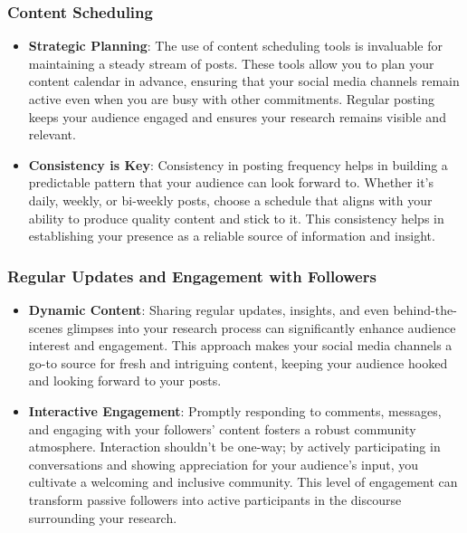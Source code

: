 \documentclass[
]{book}
\begin{document}
\hypertarget{content-scheduling}{%
\subsubsection{Content Scheduling}\label{content-scheduling}}

\begin{itemize}
\item
  \textbf{Strategic Planning}: The use of content scheduling tools is invaluable for maintaining a steady stream of posts. These tools allow you to plan your content calendar in advance, ensuring that your social media channels remain active even when you are busy with other commitments. Regular posting keeps your audience engaged and ensures your research remains visible and relevant.
\item
  \textbf{Consistency is Key}: Consistency in posting frequency helps in building a predictable pattern that your audience can look forward to. Whether it's daily, weekly, or bi-weekly posts, choose a schedule that aligns with your ability to produce quality content and stick to it. This consistency helps in establishing your presence as a reliable source of information and insight.
\end{itemize}

\hypertarget{regular-updates-and-engagement-with-followers}{%
\subsubsection{Regular Updates and Engagement with Followers}\label{regular-updates-and-engagement-with-followers}}

\begin{itemize}
\item
  \textbf{Dynamic Content}: Sharing regular updates, insights, and even behind-the-scenes glimpses into your research process can significantly enhance audience interest and engagement. This approach makes your social media channels a go-to source for fresh and intriguing content, keeping your audience hooked and looking forward to your posts.
\item
  \textbf{Interactive Engagement}: Promptly responding to comments, messages, and engaging with your followers' content fosters a robust community atmosphere. Interaction shouldn't be one-way; by actively participating in conversations and showing appreciation for your audience's input, you cultivate a welcoming and inclusive community. This level of engagement can transform passive followers into active participants in the discourse surrounding your research.
\end{itemize}
\end{document}
